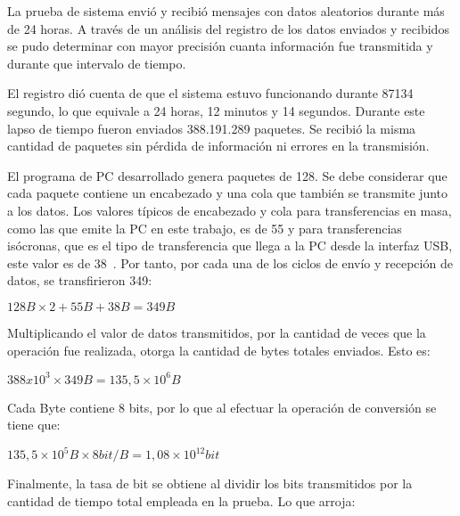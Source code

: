 La prueba de sistema envió y recibió mensajes con datos aleatorios durante más de 24 horas. A través de un análisis del registro de los datos enviados y recibidos se pudo determinar con mayor precisión cuanta información fue transmitida y durante que intervalo de tiempo.

El registro dió cuenta de que el sistema estuvo funcionando durante 87134 segundo, lo que equivale a 24 horas, 12 minutos y 14 segundos. Durante este lapso de tiempo fueron enviados 388.191.289 paquetes. Se recibió la misma cantidad de paquetes sin pérdida de información ni errores en la transmisión. 

El programa de PC desarrollado genera paquetes de \SI{128}{\byte}. Se debe considerar que cada paquete contiene un encabezado y una cola que también se transmite junto a los datos. Los valores típicos de encabezado y cola para transferencias en masa, como las que emite la PC en este trabajo, es de \SI{55}{\byte} y para transferencias isócronas, que es el tipo de transferencia que llega a la PC desde la interfaz USB, este valor es de \SI{38}{\byte}~\cite{USBspec}. Por tanto, por cada una de los ciclos de envío y recepción de datos, se transfirieron \SI{349}{\byte}:

\begin{center}
	\begin{math}
		128 B \times 2 + 55 B + 38 B = 349 B 
	\end{math}
\end{center}

Multiplicando el valor de datos transmitidos, por la cantidad de veces que la operación fue realizada, otorga la cantidad de bytes totales enviados. Esto es:

\begin{center}
	\begin{math}
		388x10^3 \times 349 B = 135,5 \times 10^6 B
	\end{math}
\end{center}

Cada Byte contiene 8 bits, por lo que al efectuar la operación de conversión se tiene que:

\begin{center}
	\begin{math}
		135,5 \times 10^5 B \times 8 bit/B = 1,08 \times 10^12 bit
	\end{math}
\end{center}

Finalmente, la tasa de bit se obtiene al dividir los bits transmitidos por la cantidad de tiempo total empleada en la prueba. Lo que arroja:

